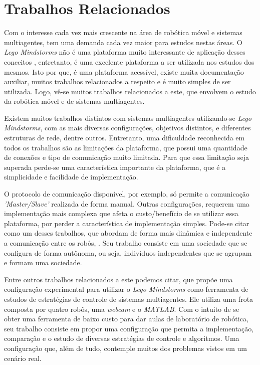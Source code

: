 %
%
\chapter{Trabalhos Relacionados}
\label{chap:trabalhosRelacionados}
Com o interesse cada vez mais crescente na área de robótica móvel e sistemas multiagentes, tem uma demanda cada vez maior para estudos nestas áreas. O \emph{Lego Mindstorms\textregistered} não é uma plataforma muito interessante de aplicação desses conceitos , entretanto, é uma excelente plataforma a ser utilizada nos estudos dos mesmos. Isto por que, é uma plataforma acessível, existe muita documentação auxiliar, muitos trabalhos relacionados a respeito e é muito simples de ser utilizada. Logo, vê-se muitos trabalhos relacionados a este, que envolvem o estudo da robótica móvel e de sistemas multiagentes.

Existem muitos trabalhos distintos com sistemas multiagentes utilizando-se \emph{Lego Mindstorms\textregistered}, com as mais diversas configurações, objetivos distintos, e diferentes estruturas de rede, dentre outros. Entretanto, uma dificuldade reconhecida em todos os trabalhos são as limitações da plataforma, que possui uma quantidade de conexões e tipo de comunicação muito limitada. Para que essa limitação seja superada perde-se uma característica importante da plataforma, que é a simplicidade e facilidade de implementação. 

O protocolo de comunicação disponível, por exemplo, só permite a comunicação \emph{'Master/Slave'} realizada de forma manual. Outras configurações, requerem uma implementação mais complexa que afeta o custo/benefício de se utilizar essa plataforma, por perder a característica de implementação simples. Pode-se citar como um desses trabalhos, que abordam de forma mais dinâmica e independente a comunicação entre os robôs, . Seu trabalho consiste em uma sociedade que se configura de forma autônoma, ou seja,  indivíduos independentes que se agrupam e formam uma sociedade.

Entre outros trabalhos relacionados a este podemos citar,  que propõe uma configuração experimental para utilizar o \emph{Lego  Mindstorms\textregistered} como ferramenta de estudos de estratégias de controle de sistemas multiagentes. Ele utiliza uma frota composta por quatro robôs, uma \emph{webcam} e o \emph{MATLAB\textregistered}. Com o intuito de se obter uma ferramenta de baixo custo para dar aulas de laboratório de robótica, seu trabalho consiste em propor uma configuração que permita a implementação, comparação e o estudo de diversas estratégias de controle e algoritmos. Uma configuração que, além de tudo, contemple muitos dos problemas vistos em um cenário real. 

